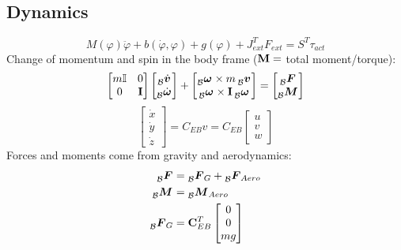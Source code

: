 \documentclass[a4paper, 8pt]{extarticle}
\newcommand{\mvec}[3]{  \prescript{}{\mathcal{#1}}{\bm{#2}}  _{#3} }
\newcommand{\mdvec}[3]{ \prescript{}{\mathcal{#1}}{\dot{\bm #2}} _{#3} }
\begin{document}
\begin{multicols*}{3}
\subsection{Dynamics}
$$\boxed{ M(\varphi)\ddot{\varphi}+b(\dot{\varphi},\varphi)+g(\varphi)+J_{ext}^T F_{ext}=S^T\tau_{act}}$$
Change of momentum and spin in the body frame (${\bf M} = $ total moment/torque):
$$\begin{bmatrix}
m\mathbb{I} & 0\\
0 & {\bf I}
\end{bmatrix}\begin{bmatrix}
\mdvec{B}{v}{} \\
\mdvec{B}{\omega}{}
\end{bmatrix} + \begin{bmatrix}
\mvec{B}{\omega}{} \times m \mvec{B}{v}{} \\
\mvec{B}{\omega}{} \times {\bf I}\mvec{B}{\omega}{}
\end{bmatrix} = \begin{bmatrix}
\mvec{B}{F}{}\\ \mvec{B}{M}{}
\end{bmatrix}
$$
$$ \begin{bmatrix} \dot{x} \\ \dot{y}\\ \dot{z} \end{bmatrix}=C_{EB}v=C_{EB}\begin{bmatrix} u\\ v\\ w\end{bmatrix} $$
Forces and moments come from gravity and aerodynamics:
\begin{align*}
\mvec{B}{F}{} &= \mvec{B}{F}{G} + \mvec{B}{F}{Aero} \\
\mvec{B}{M}{} &= \mvec{B}{M}{Aero} \\
\mvec{B}{F}{G} &= \mathbf{C}_{EB}^T \begin{bmatrix}
0 \\ 0 \\ mg
\end{bmatrix} \\

\end{align*}
\end{multicols*}
\end{document}
